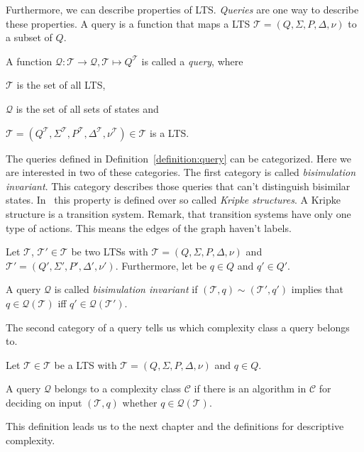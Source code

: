 Furthermore, we can describe properties of LTS. \textit{Queries} are one way to describe these properties. A query
is a function that maps a LTS $\mathcal{T} = (Q, \Sigma, P, \Delta, \nu)$ to a subset of $Q$.

\begin{definition}
    \label{definition:query}
    A function $\mathcal{Q} : \mathscr{T} \rightarrow \mathscr{Q}, \mathcal{T} \mapsto Q^\mathcal{T}$ is called a
    \emph{query},
    where
    \begin{compactitem}
        \item $\mathscr{T}$ is the set of all LTS,
        \item $\mathscr{Q}$ is the set of all sets of states and
        \item $\mathcal{T} = (Q^\mathcal{T}, \Sigma^\mathcal{T}, P^\mathcal{T}, \Delta^\mathcal{T}, \nu^\mathcal{T})
        \in \mathscr{T}$ is a LTS.
    \end{compactitem}
\end{definition}

The queries defined in Definition~\ref{definition:query} can be categorized. Here we are interested in two of these
categories. The first category is called \textit{bisimulation invariant}. This category describes those queries that
can't distinguish bisimilar states. In~\cite{otto1999bisimulation} this property is defined over so called
\textit{Kripke structures}. A Kripke structure
is a transition system. Remark, that transition systems  have only one type of actions. This means the edges of the
graph haven't labels.

\begin{definition}
    \label{definition:bisimulationInvariant}
    Let $\mathcal{T}$, $\mathcal{T}' \in \mathscr{T}$ be two LTSs with $\mathcal{T} = (Q, \Sigma, P, \Delta, \nu)$
    and $\mathcal{T}' = (Q', \Sigma', P', \Delta', \nu')$. Furthermore, let be $q \in Q$ and $q' \in Q'$.

    A query $\mathcal{Q}$ is called \emph{bisimulation invariant} if $(\mathcal{T}, q) \sim (\mathcal{T}', q')$
    implies that
    $q \in \mathcal{Q}(\mathcal{T})$ iff $q' \in \mathcal{Q}(\mathcal{T'})$.
\end{definition}

The second category of a query tells us which complexity class a query belongs to.

\begin{definition}
    \label{definition:queryBelongsToComplexityClass}
    Let $\mathcal{T} \in \mathscr{T}$ be a LTS with $\mathcal{T} = (Q, \Sigma, P, \Delta, \nu)$ and $q \in Q$.

    A query $\mathcal{Q}$ belongs to a complexity class $\mathcal{C}$ if there is an algorithm in $\mathcal{C}$ for
    deciding on input $(\mathcal{T}, q)$ whether $q \in \mathcal{Q}(\mathcal{T})$.
\end{definition}

This definition leads us to the next chapter and the definitions for descriptive complexity.